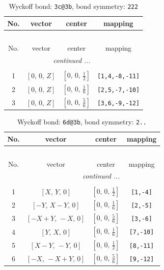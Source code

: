 \documentclass[fleqn,8pt]{jsarticle}
\begin{document}
\renewcommand{\arraystretch}{1.2}
\begin{longtable}{cccc}
\caption{Wyckoff bond: {\tt 3c@3b}, bond symmetry: {\tt 222}}
 \\
 \hline \hline
No. & vector & center & mapping \\ \hline \endfirsthead

\multicolumn{3}{l}{\tablename\ \thetable{}} \\
 \hline \hline
No. & vector & center & mapping \\ \hline \endhead

 \hline \hline
\multicolumn{3}{r}{\footnotesize\it continued ...} \\ \endfoot

 \hline \hline
\multicolumn{3}{r}{} \\ \endlastfoot

1 & $\left[ 0,\, 0,\, Z \right]$ & $\left[ 0,\, 0,\, \frac{1}{2} \right]$ & {\tt [1,4,-8,-11]} \\ \hline
2 & $\left[ 0,\, 0,\, Z \right]$ & $\left[ 0,\, 0,\, \frac{1}{6} \right]$ & {\tt [2,5,-7,-10]} \\ \hline
3 & $\left[ 0,\, 0,\, Z \right]$ & $\left[ 0,\, 0,\, \frac{5}{6} \right]$ & {\tt [3,6,-9,-12]} \\
\end{longtable}
\renewcommand{\arraystretch}{1.2}
\begin{longtable}{cccc}
\caption{Wyckoff bond: {\tt 6d@3b}, bond symmetry: {\tt 2..}}
 \\
 \hline \hline
No. & vector & center & mapping \\ \hline \endfirsthead

\multicolumn{3}{l}{\tablename\ \thetable{}} \\
 \hline \hline
No. & vector & center & mapping \\ \hline \endhead

 \hline \hline
\multicolumn{3}{r}{\footnotesize\it continued ...} \\ \endfoot

 \hline \hline
\multicolumn{3}{r}{} \\ \endlastfoot

1 & $\left[ X,\, Y,\, 0 \right]$ & $\left[ 0,\, 0,\, \frac{1}{2} \right]$ & {\tt [1,-4]} \\ \hline
2 & $\left[ - Y,\, X - Y,\, 0 \right]$ & $\left[ 0,\, 0,\, \frac{1}{6} \right]$ & {\tt [2,-5]} \\ \hline
3 & $\left[ - X + Y,\, - X,\, 0 \right]$ & $\left[ 0,\, 0,\, \frac{5}{6} \right]$ & {\tt [3,-6]} \\ \hline
4 & $\left[ Y,\, X,\, 0 \right]$ & $\left[ 0,\, 0,\, \frac{1}{6} \right]$ & {\tt [7,-10]} \\ \hline
5 & $\left[ X - Y,\, - Y,\, 0 \right]$ & $\left[ 0,\, 0,\, \frac{1}{2} \right]$ & {\tt [8,-11]} \\ \hline
6 & $\left[ - X,\, - X + Y,\, 0 \right]$ & $\left[ 0,\, 0,\, \frac{5}{6} \right]$ & {\tt [9,-12]} \\
\end{longtable}
\end{document}
